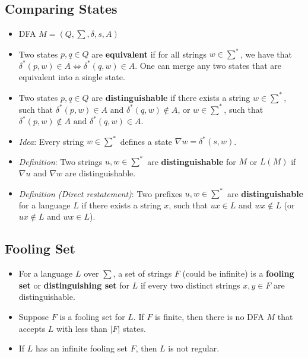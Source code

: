\subsection{Comparing States}
\begin{itemize}
    \item DFA $M = (Q, \sum, \delta, s, A)$
    \item Two states $p,q \in Q$ are \textbf{equivalent} if for all strings $w \in \sum^{\ast}$, we have that $\delta^{\ast}(p, w) \in A \iff \delta^{\ast}(q, w) \in A$. One can merge any two states that are equivalent into a single state.
    \item Two states $p,q \in Q$ are \textbf{distinguishable} if there exists a string $w \in \sum^{\ast}$, such that $\delta^{\ast}(p, w) \in A \text{ and } \delta^{\ast}(q, w) \notin A$, or $w \in \sum^{\ast}$, such that $\delta^{\ast}(p, w) \notin A \text{ and } \delta^{\ast}(q, w) \in A$.
    \item \textit{Idea}: Every string $w \in \sum^{\ast}$ defines a state $\nabla w = \delta^{\ast}(s,w)$.
    \item \textit{Definition}: Two strings $u, w \in \sum^{\ast}$ are \textbf{distinguishable} for $M$ or $L(M)$ if $\nabla u$ and $\nabla w$ are distinguishable.
    \item \textit{Definition (Direct restatement)}: Two prefixes $u, w \in \sum^{\ast}$ are \textbf{distinguishable} for a language $L$ if there exists a string $x$, such that $ux \in L$ and $wx \notin L$ (or $ux \notin L$ and $wx \in L$).
\end{itemize}

\subsection{Fooling Set}
\begin{itemize}
    \item For a language $L$ over $\sum$, a set of strings $F$ (could be infinite) is a \textbf{fooling set} or \textbf{distinguishing set} for $L$ if every two distinct strings $x, y \in F$ are distinguishable.
    \item Suppose $F$ is a fooling set for $L$. If $F$ is finite, then there is no DFA $M$ that accepts $L$ with less than $\left|{F}\right|$ states.
    \item If $L$ has an infinite fooling set $F$, then $L$ is not regular.
\end{itemize}

